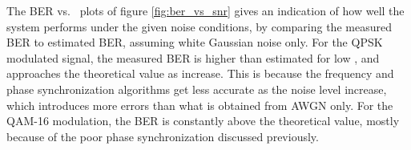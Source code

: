 The BER vs. \ebnot\ plots of figure \ref{fig:ber_vs_snr} gives an indication of how well the system performs under the given noise conditions, by comparing the measured BER to estimated BER, assuming white Gaussian noise only. For the QPSK modulated signal, the measured BER is higher than estimated for low \ebnot, and approaches the theoretical value as \ebnot increase. This is because the frequency and phase synchronization algorithms get less accurate as the noise level increase, which introduces more errors than what is obtained from AWGN only. For the QAM-16 modulation, the BER is constantly above the theoretical value, mostly because of the poor phase synchronization discussed previously. 



